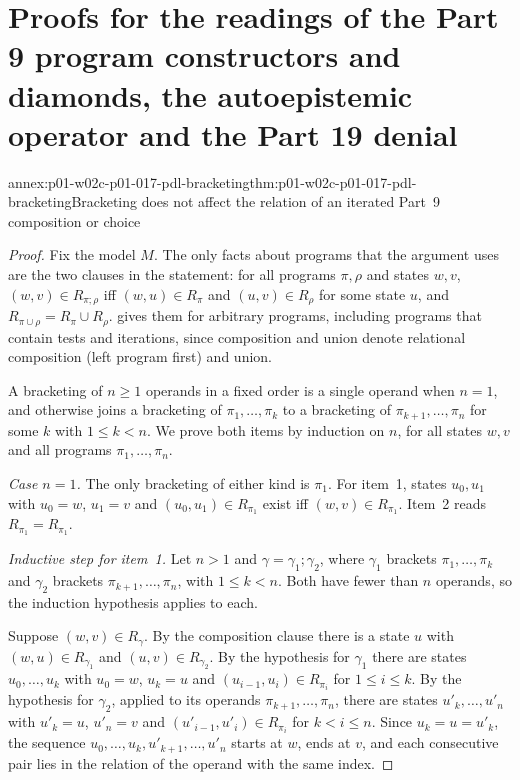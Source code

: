 \section{Proofs for the readings of the Part 9 program constructors and diamonds, the autoepistemic operator and the Part 19 denial}
\label{sec:annex-p01-w02c-p01-017-readings}

\begin{annexitem}{annex:p01-w02c-p01-017-pdl-bracketing}{thm:p01-w02c-p01-017-pdl-bracketing}{Bracketing does not affect the relation of an iterated Part~9 composition or choice}
\begin{proof}
Fix the model \(M\).  The only facts about programs that the argument uses
are the two clauses in the statement: for all programs \(\pi,\rho\) and
states \(w,v\), \((w,v)\in R_{\pi;\rho}\) iff \((w,u)\in R_\pi\) and
\((u,v)\in R_\rho\) for some state \(u\), and
\(R_{\pi\cup\rho}=R_\pi\cup R_\rho\).   gives them for
arbitrary programs, including programs that contain tests and iterations,
since composition and union denote relational composition (left program
first) and union.

A bracketing of \(n\geq1\) operands in a fixed order is a single operand
when \(n=1\), and otherwise joins a bracketing of \(\pi_1,\ldots,\pi_k\)
to a bracketing of \(\pi_{k+1},\ldots,\pi_n\) for some \(k\) with
\(1\leq k<n\).  We prove both items by induction on \(n\), for all states
\(w,v\) and all programs \(\pi_1,\ldots,\pi_n\).

\emph{Case \(n=1\).}  The only bracketing of either kind is \(\pi_1\).  For
item~1, states \(u_0,u_1\) with \(u_0=w\), \(u_1=v\) and
\((u_0,u_1)\in R_{\pi_1}\) exist iff \((w,v)\in R_{\pi_1}\).  Item~2 reads
\(R_{\pi_1}=R_{\pi_1}\).

\emph{Inductive step for item~1.}  Let \(n>1\) and
\(\gamma=\gamma_1;\gamma_2\), where \(\gamma_1\) brackets
\(\pi_1,\ldots,\pi_k\) and \(\gamma_2\) brackets
\(\pi_{k+1},\ldots,\pi_n\), with \(1\leq k<n\).  Both have fewer than
\(n\) operands, so the induction hypothesis applies to each.

Suppose \((w,v)\in R_\gamma\).  By the composition clause there is a state
\(u\) with \((w,u)\in R_{\gamma_1}\) and \((u,v)\in R_{\gamma_2}\).  By the
hypothesis for \(\gamma_1\) there are states \(u_0,\ldots,u_k\) with
\(u_0=w\), \(u_k=u\) and \((u_{i-1},u_i)\in R_{\pi_i}\) for
\(1\leq i\leq k\).  By the hypothesis for \(\gamma_2\), applied to its
operands \(\pi_{k+1},\ldots,\pi_n\), there are states
\(u'_k,\ldots,u'_n\) with \(u'_k=u\), \(u'_n=v\) and
\((u'_{i-1},u'_i)\in R_{\pi_i}\) for \(k<i\leq n\).  Since \(u_k=u=u'_k\),
the sequence \(u_0,\ldots,u_k,u'_{k+1},\ldots,u'_n\) starts at \(w\),
ends at \(v\), and each consecutive pair lies in the relation of the
operand with the same index.


\end{proof}
\end{annexitem}
